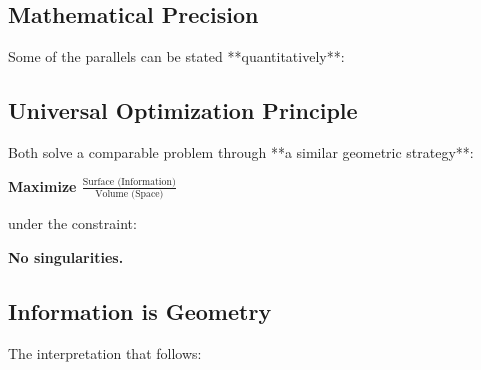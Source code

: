 	\subsection{Mathematical Precision}

	Some of the parallels can be stated **quantitatively**:

	\begin{table}[H]
		\centering
		\small
		\caption{Quantitative parallels}
	\end{table}

	\subsection{Universal Optimization Principle}

	Both solve a comparable problem through **a similar geometric strategy**:

	\begin{center}

		\textbf{Maximize $\frac{\text{Surface (Information)}}{\text{Volume (Space)}}$}

		\normalsize
		under the constraint:


		\textbf{No singularities.}
	\end{center}

	\subsection{Information is Geometry}

	The interpretation that follows:

